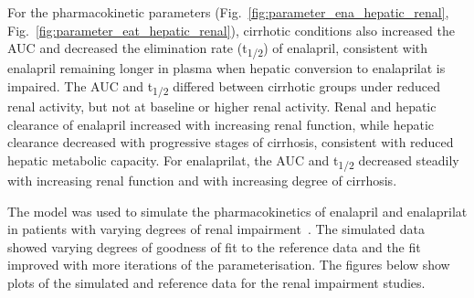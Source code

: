 \documentclass[pharmaceutics,article,submit,pdftex,moreauthors]{Definitions/mdpi}
\begin{document}
For the pharmacokinetic parameters (Fig.~\ref{fig:parameter_ena_hepatic_renal}, Fig.~\ref{fig:parameter_eat_hepatic_renal}), cirrhotic conditions also increased the AUC and decreased the elimination rate (t\textsubscript{1/2}) of enalapril, consistent with enalapril remaining longer in plasma when hepatic conversion to enalaprilat is impaired. The AUC and t\textsubscript{1/2} differed between cirrhotic groups under reduced renal activity, but not at baseline or higher renal activity. Renal and hepatic clearance of enalapril increased with increasing renal function, while hepatic clearance decreased with progressive stages of cirrhosis, consistent with reduced hepatic metabolic capacity. For enalaprilat, the AUC and t\textsubscript{1/2} decreased steadily with increasing renal function and with increasing degree of cirrhosis.



The model was used to simulate the pharmacokinetics of enalapril and enalaprilat in patients with varying degrees of renal impairment~\cite{Fruncillo1987, Hockings1986, Kelly1986, Lees1987a, Lowenthal1985, Weisser1992}. The simulated data showed varying degrees of goodness of fit to the reference data and the fit improved with more iterations of the parameterisation. The figures below show plots of the simulated and reference data for the renal impairment studies.
\end{document}
